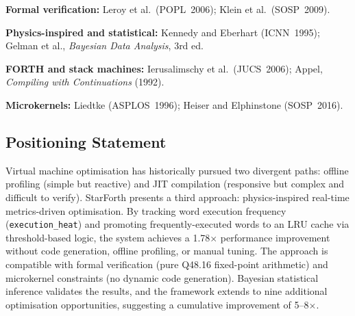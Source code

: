 \textbf{Formal verification:} Leroy et al.\ (POPL~2006); Klein et al.\
(SOSP~2009).

\textbf{Physics-inspired and statistical:} Kennedy and Eberhart (ICNN~1995);
Gelman et al., \textit{Bayesian Data Analysis}, 3rd ed.

\textbf{FORTH and stack machines:} Ierusalimschy et al.\
(JUCS~2006); Appel, \textit{Compiling with Continuations} (1992).

\textbf{Microkernels:} Liedtke (ASPLOS~1996); Heiser and Elphinstone
(SOSP~2016).

\subsection{Positioning Statement}

Virtual machine optimisation has historically pursued two divergent paths:
offline profiling (simple but reactive) and JIT compilation (responsive but
complex and difficult to verify). StarForth presents a third approach:
physics-inspired real-time metrics-driven optimisation. By tracking word
execution frequency (\texttt{execution\_heat}) and promoting
frequently-executed words to an LRU cache via threshold-based logic, the
system achieves a 1.78$\times$ performance improvement without code
generation, offline profiling, or manual tuning. The approach is compatible
with formal verification (pure Q48.16 fixed-point arithmetic) and microkernel
constraints (no dynamic code generation). Bayesian statistical inference
validates the results, and the framework extends to nine additional
optimisation opportunities, suggesting a cumulative improvement of 5--8$\times$.
